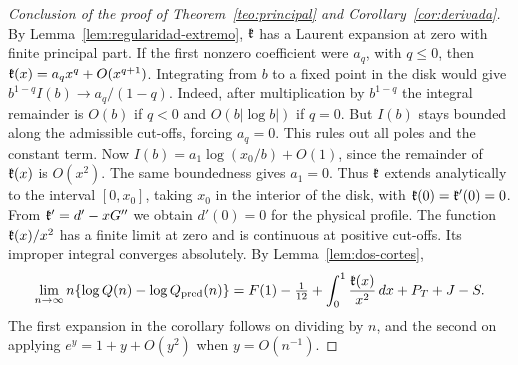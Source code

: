 \begin{proof}[Conclusion of the proof of Theorem~\ref{teo:principal} and Corollary~\ref{cor:derivada}]
By Lemma~\ref{lem:regularidad-extremo}, \(\mathfrak{k}\) has a Laurent expansion at zero with finite principal
part. If the first nonzero coefficient were \(a_q\), with \(q\le0\), then
\(\mathfrak{k}(x)=a_qx^q+O(x^{q+1})\). Integrating from \(b\) to a fixed point in the disk would give
\(b^{1-q}I(b)\to a_q/(1-q)\). Indeed, after multiplication by \(b^{1-q}\) the integral remainder is
\(O(b)\) if \(q<0\) and \(O(b|\log b|)\) if \(q=0\). But \(I(b)\) stays bounded along the admissible
cut-offs, forcing \(a_q=0\). This rules out all poles and the constant term. Now
\(I(b)=a_1\log(x_0/b)+O(1)\), since the remainder of \(\mathfrak{k}(x)\) is \(O(x^2)\). The same boundedness
gives \(a_1=0\). Thus \(\mathfrak{k}\) extends analytically to the interval \([0,x_0]\), taking \(x_0\) in the
interior of the disk, with \(\mathfrak{k}(0)=\mathfrak{k}'(0)=0\). From \(\mathfrak{k}'=d'-xG''\) we obtain \(d'(0)=0\)
for the physical profile. The function \(\mathfrak{k}(x)/x^2\) has a finite limit at zero and is continuous at
positive cut-offs. Its improper integral converges absolutely. By Lemma~\ref{lem:dos-cortes},
\[
 \lim_{n\to\infty}n\{\log Q(n)-\log Q_{\rm pred}(n)\}
   =F(1)-\tfrac1{12}+\int_0^1\frac{\mathfrak{k}(x)}{x^2}\,dx+P_T+J-S .
\]
The first expansion in the corollary follows on dividing by \(n\), and the second on applying
\(e^y=1+y+O(y^2)\) when \(y=O(n^{-1})\).
\end{proof}
